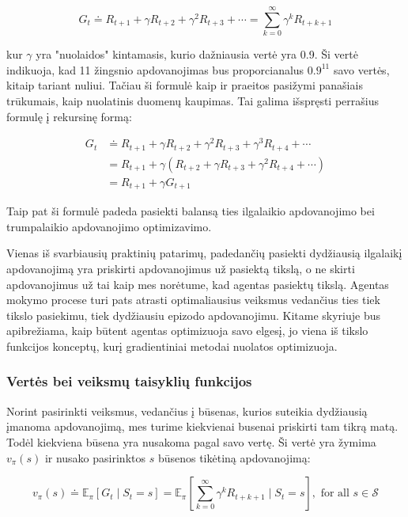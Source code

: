 \documentclass[a4paper, 12pt]{article}
\begin{document}
\begin{equation}
G_{t} \doteq R_{t+1}+\gamma R_{t+2}+\gamma^{2} R_{t+3}+\cdots=\sum_{k=0}^{\infty} \gamma^{k} R_{t+k+1}
\end{equation}

kur $\gamma$ yra "nuolaidos" kintamasis, kurio dažniausia vertė yra 0.9. Ši vertė indikuoja, kad 11 žingsnio apdovanojimas bus proporcianalus $0.9^{11}$ savo vertės, kitaip tariant nuliui. Tačiau ši formulė kaip ir praeitos pasižymi panašiais trūkumais, kaip nuolatinis duomenų kaupimas. Tai galima išspręsti perrašius formulę į rekursinę formą:

\begin{equation}
\begin{aligned}
G_{t} & \doteq R_{t+1}+\gamma R_{t+2}+\gamma^{2} R_{t+3}+\gamma^{3} R_{t+4}+\cdots \\
&=R_{t+1}+\gamma\left(R_{t+2}+\gamma R_{t+3}+\gamma^{2} R_{t+4}+\cdots\right) \\
&=R_{t+1}+\gamma G_{t+1}
\end{aligned}
\end{equation}

Taip pat ši formulė padeda pasiekti balansą ties ilgalaikio apdovanojimo bei trumpalaikio apdovanojimo optimizavimo.

\label{apdovanojimoPatarimas}
Vienas iš svarbiausių praktinių patarimų, padedančių pasiekti dydžiausią ilgalaikį apdovanojimą yra priskirti apdovanojimus už pasiektą tikslą, o ne skirti apdovanojimus už tai kaip mes norėtume, kad agentas pasiektų tikslą. Agentas mokymo procese turi pats atrasti optimaliausius veiksmus vedančius ties tiek tikslo pasiekimu, tiek dydžiausiu epizodo apdovanojimu. Kitame skyriuje bus apibrežiama, kaip būtent agentas optimizuoja savo elgesį, jo viena iš tikslo funkcijos konceptų, kurį gradientiniai metodai nuolatos optimizuoja.


\subsubsection{Vertės bei veiksmų taisyklių funkcijos}

Norint pasirinkti veiksmus, vedančius į būsenas, kurios suteikia dydžiausią įmanoma apdovanojimą, mes turime kiekvienai busenai priskirti tam tikrą matą. Todėl kiekviena būsena yra nusakoma pagal savo vertę. Ši vertė yra žymima $v_\pi(s)$ ir nusako pasirinktos $s$ būsenos tikėtiną apdovanojimą: 

\begin{equation}
v_{\pi}(s) \doteq \mathbb{E}_{\pi}\left[G_{t} \mid S_{t}=s\right]=\mathbb{E}_{\pi}\left[\sum_{k=0}^{\infty} \gamma^{k} R_{t+k+1} \mid S_{t}=s\right], \text { for all } s \in \mathcal{S}
\end{equation}
\end{document}
